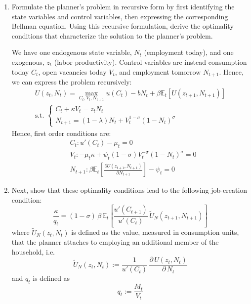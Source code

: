 \documentclass[dvipsnames,11pt]{article}
\begin{document}
        \begin{enumerate}
            
            \item Formulate the planner's problem in recursive form by first identifying the state variables and control variables, then expressing the corresponding Bellman equation. Using this recursive formulation, derive the optimality conditions that characterize the solution to the planner's problem.

                \begin{solution}
We have one endogenous state variable, $N_t$ (employment today), and one exogenous, $z_t$ (labor productivity). Control variables are instead consumption today $C_t$, open vacancies today $V_t$, and employment tomorrow $N_{t+1}$. Hence, we can express the problem recursively:
\begin{align*}
    U(z_t,N_t)= \max_{C_t,V_t,N_{t+1}} u(C_t)-bN_t+\beta \mathbb{E}_t [U(z_{t+1},N_{t+1})] \\
    \text{s.t. } \begin{cases}
        C_t+\kappa V_t =z_tN_t \\
        N_{t+1}=(1-\lambda)N_t+V_t^{1-\sigma}(1-N_t)^\sigma
    \end{cases}
\end{align*}
Hence, first order conditions are:
\begin{align*}
    & C_t: u'(C_t)-\mu_t=0 \\
    & V_t: -\mu_t \kappa +\psi_t (1-\sigma)V_t^{-\sigma}(1-N_t)^\sigma=0 \\
    & N_{t+1}: \beta \mathbb{E}_t \left[ \frac{\partial U(z_{t+1},N_{t+1})}{\partial N_{t+1}}\right]-\psi_t=0
\end{align*}
                    
                    
                \end{solution}

            \item Next, show that these optimality conditions lead to the following job-creation condition:
            $$ \frac{\kappa}{q_t} = (1-\sigma) \, \beta\,\mathbb{E}_t\left[\frac{u'(C_{t+1})}{u'(C_t)}\, \widetilde{U}_N(z_{t+1},N_{t+1})\right] $$
            where $\widetilde{U}_N(z_{t},N_{t})$ is defined as the value, measured in consumption units, that the planner attaches to employing an additional member of the household, i.e.
            $$ \widetilde{U}_N(z_{t},N_{t}) := \frac{1}{u'(C_t)}\,\frac{\partial\,U(z_{t},N_{t})}{\partial\,N_t} $$
            and $q_t$ is defined as
            $$ q_t := \frac{M_t}{V_t} $$


\end{enumerate}
\end{document}

